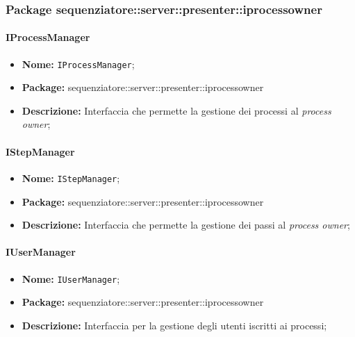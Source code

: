 \subsubsection{Package sequenziatore::server::presenter::iprocessowner}
\paragraph{IProcessManager}
	\begin{itemize}
		\item \textbf{Nome:} \texttt{IProcessManager};
		\item \textbf{Package:} sequenziatore::server::presenter::iprocessowner
		\item \textbf{Descrizione:} Interfaccia che permette la gestione dei processi al \textit{process owner};
	\end{itemize}


\paragraph{IStepManager}
	\begin{itemize}
		\item \textbf{Nome:} \texttt{IStepManager};
		\item \textbf{Package:} sequenziatore::server::presenter::iprocessowner
		\item \textbf{Descrizione:} Interfaccia che permette la gestione dei passi al \textit{process owner};
	\end{itemize}

\paragraph{IUserManager}
	\begin{itemize}
		\item \textbf{Nome:} \texttt{IUserManager};
		\item \textbf{Package:} sequenziatore::server::presenter::iprocessowner
		\item \textbf{Descrizione:} Interfaccia per la gestione degli utenti iscritti ai processi;
	\end{itemize}

